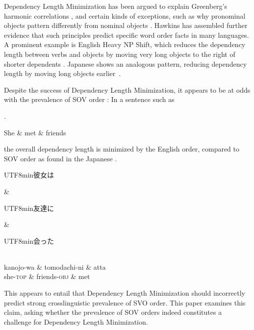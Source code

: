 \documentclass[11pt,a4paper]{article}
\newcommand{\japanese}[1]{\begin{CJK}{UTF8}{min}#1\end{CJK}}
\begin{document}
Dependency Length Minimization has been argued to explain Greenberg's harmonic correlations \citep{rijkhoff-word-1986, hawkins1994performance}, and certain kinds of exceptions, such as why pronominal objects pattern differently from nominal objects \citep{dryer1992greenbergian}. %
Hawkins \citep{hawkins2004efficiency, hawkins2007processing, hawkins2014crosslinguistic} has assembled further evidence that such principles predict specific word order facts in many languages. 
A prominent example is English Heavy NP Shift, which reduces the dependency length between verbs and objects by moving very long objects to the right of shorter dependents \citep{hawkins1994performance, wasow1997end}.
Japanese shows an analogous pattern, reducing dependency length by moving long objects earlier~\citep{yamashita2001long}.

Despite the success of Dependency Length Minimization, it appears to be at odds with the prevalence of SOV order \citep{ferrer-i-cancho-placement-2017}: In a sentence such as

\ex.
\begin{dependency}[theme = simple]
   \begin{deptext}[column sep=1em]
          She \& met \& friends  \\
   \end{deptext}
\end{dependency}

the overall dependency length is minimized by the English order, compared to SOV order as found in the Japanese
\ex.
\begin{dependency}[theme = simple]
   \begin{deptext}[column sep=1em]
          \japanese{彼女は} \& \japanese{友達に} \& \japanese{会った}  \\
          kanojo-wa \& tomodachi-ni \& atta \\ 
          she-\textsc{top} \& friends-\textsc{obj} \& met \\
   \end{deptext}
\end{dependency}

This appears to entail that Dependency Length Minimization should incorrectly predict strong crosslinguistic prevalence of SVO order.
This paper examines this claim,  
asking whether the prevalence of SOV orders indeed constitutes a challenge for Dependency Length Minimization.
\end{document}
